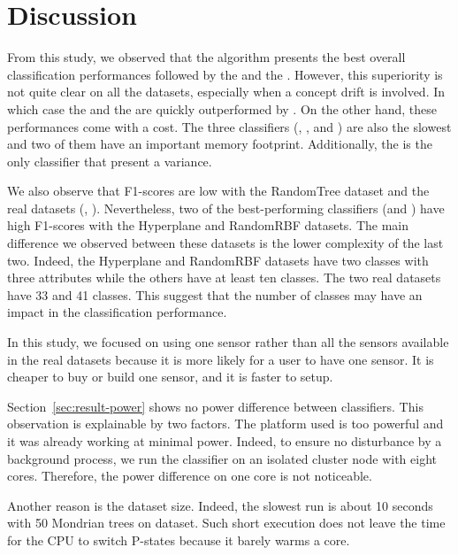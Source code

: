 \section{Discussion}
From this study, we observed that the \hoeffdingtree algorithm presents the
best overall classification performances followed by the \mondrianforest and
the \naivebayes. However, this superiority is not quite clear on all the
datasets, especially when a concept drift is involved. In which case the
\mondrianforest and the \naivebayes are quickly outperformed by \mcnn.  On the
other hand, these performances come with a cost. The three classifiers
(\hoeffdingtree, \mondrianforest, and \naivebayes) are also the slowest and two
of them have an important memory footprint. Additionally, the \mondrianforest
is the only classifier that present a variance.

We also observe that F1-scores are low with the RandomTree dataset and the real
datasets (\banosdataset, \recofitdataset). Nevertheless, two of the
best-performing classifiers (\hoeffdingtree and \mondrianforest) have high
F1-scores with the Hyperplane and RandomRBF datasets. The main difference we
observed between these datasets is the lower complexity of the last two.
Indeed, the Hyperplane and RandomRBF datasets have two classes with three
attributes while the others have at least ten classes. The two real datasets
have 33 and 41 classes. This suggest that the number of classes may have an
impact in the classification performance.

In this study, we focused on using one sensor rather than all the sensors
available in the real datasets because it is more likely for a user to have one
sensor. It is cheaper to buy or build one sensor, and it is faster to setup.

Section~\ref{sec:result-power} shows no power difference between classifiers. This
observation is explainable by two factors. The platform used is too powerful
and it was already working at minimal power. Indeed, to ensure no disturbance
by a background process, we run the classifier on an isolated cluster node with
eight cores. Therefore, the power difference on one core is not noticeable.

Another reason is the dataset size. Indeed, the slowest run is about
10 seconds with 50 Mondrian trees on \recofitdataset dataset.  Such short
execution does not leave the time for the CPU to switch P-states because it
barely warms a core.

